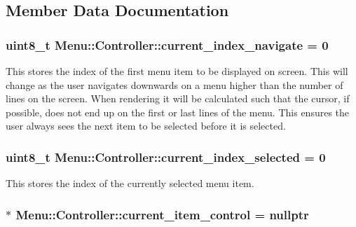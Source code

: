 \subsection{Member Data Documentation}
\hypertarget{class_menu_1_1_controller_a86055b66afbad89c5a0b8a0a1713f9d3}{
\subsubsection[{current\-\_\-index\-\_\-navigate}]{\setlength{\rightskip}{0pt plus 5cm}uint8\-\_\-t Menu\-::\-Controller\-::current\-\_\-index\-\_\-navigate = 0\hspace{0.3cm}{\ttfamily [private]}}}\label{class_menu_1_1_controller_a86055b66afbad89c5a0b8a0a1713f9d3}
This stores the index of the first menu item to be displayed on screen. This will change as the user navigates downwards on a menu higher than the number of lines on the screen. When rendering it will be calculated such that the cursor, if possible, does not end up on the first or last lines of the menu. This ensures the user always sees the next item to be selected before it is selected. \hypertarget{class_menu_1_1_controller_ab3bdee08f22d55f8fa0cb9e29bb27d66}{
\subsubsection[{current\-\_\-index\-\_\-selected}]{\setlength{\rightskip}{0pt plus 5cm}uint8\-\_\-t Menu\-::\-Controller\-::current\-\_\-index\-\_\-selected = 0\hspace{0.3cm}{\ttfamily [private]}}}\label{class_menu_1_1_controller_ab3bdee08f22d55f8fa0cb9e29bb27d66}
This stores the index of the currently selected menu item. \hypertarget{class_menu_1_1_controller_a288e26b1efe4fd953b5514de72a1c508}{
\subsubsection[{current\-\_\-item\-\_\-control}]{$\ast$ Menu\-::\-Controller\-::current\-\_\-item\-\_\-control = nullptr\hspace{0.3cm}{\ttfamily [private]}}}\label{class_menu_1_1_controller_a288e26b1efe4fd953b5514de72a1c508}
